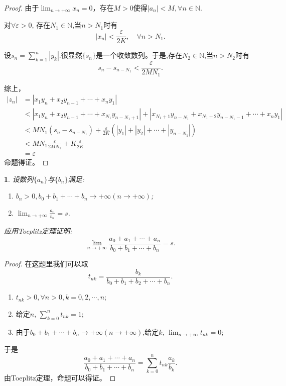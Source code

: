 \documentclass[utf8]{book}
\newtheorem{example}{}[section]             %
\begin{document}
\begin{proof}
由于$\displaystyle\lim_{n\to +\infty}x_n=0$，存在$M > 0$使得$|a_n| < M, \forall n\in\mathbb{N}$.

对$\forall \varepsilon > 0$, 存在$N_1\in\mathbb{N}$,当$n>N_1$时有$$\left|x_n\right| < \frac{\varepsilon}{2K}, \quad\forall n > N_1.$$

设$s_n=\displaystyle\sum_{k=1}^{n}\left|y_k\right|$.很显然$\{s_n\}$是一个收敛数列。于是,存在$N_2\in\mathbb{N}$,当$n>N_2$时有
$$s_{n} - s_{n-N_1} <\frac{\varepsilon}{2MN_1}.$$

综上，
\begin{equation*}
\begin{split}
\left|z_n\right|&=\left|x_1y_n+x_2y_{n-1}+\cdots+x_ny_1\right|\\
&<\left|x_1y_n+x_2y_{n-1}+\cdots+x_{N_1}y_{n-N_1+1}\right| + \left|x_{N_1+1}y_{n-N_1}+x_{N_1+2}y_{n-N_1-1}+\cdots+x_{n}y_1\right|\\
&<MN_1(s_n-s_{n-N_1}) + \frac{\varepsilon}{2K}(|y_1|+|y_2|+\cdots +|y_{n-N_1}|)\\
&<MN_1\frac{\varepsilon}{2MN_1}+K\frac{\varepsilon}{2K} \\&= \varepsilon
\end{split}
\end{equation*}
命题得证。
\end{proof}
\begin{example}
设数列$\{a_n\}$与$\{b_n\}$满足:
\renewcommand\labelenumi{\normalfont(\theenumi)}
\begin{enumerate}
\item $b_n>0, b_0+b_1+\cdots+b_n\rightarrow +\infty(n\rightarrow+\infty)$;
\item $\displaystyle\lim_{n\to +\infty}\frac{a_n}{b_n}=s$.
\end{enumerate}
应用Toeplitz定理证明:
$$\displaystyle\lim_{n\to +\infty}\frac{a_0+a_1+\cdots+a_n}{b_0+b_1+\cdots+b_n}=s.$$
\end{example}
\begin{proof}
在这题里我们可以取$$t_{nk} = \displaystyle\frac{b_k}{b_0+b_1+b_2+\cdots+b_n}.$$ 
\renewcommand\labelenumi{\normalfont(\theenumi)}
\begin{enumerate}
\item $t_{nk} > 0, \forall n > 0, k=0,2,\cdots,n$;
\item 给定$n$, $\displaystyle\sum_{k=0}^{n}t_{nk} = 1$;
\item 由于$b_0+b_1+\cdots+b_n\rightarrow +\infty(n\rightarrow+\infty)$,给定$k$, $\displaystyle\lim_{n\to +\infty}t_{nk} = 0$;
\end{enumerate}

于是
$$\frac{a_0+a_1+\cdots+a_n}{b_0+b_1+\cdots+b_n}=\displaystyle\sum_{k=0}^{n}t_{nk}\frac{a_k}{b_k}.$$
由Toeplitz定理，命题可以得证。
\end{proof}
\end{document}
